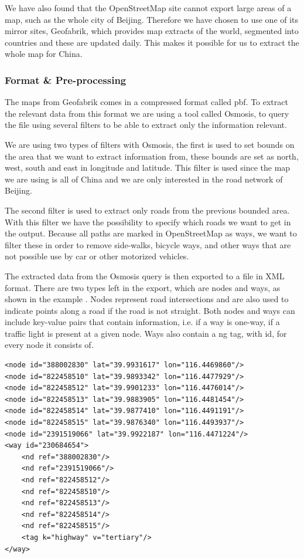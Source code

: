 We have also found that the OpenStreetMap site cannot export large areas of a map, such as the whole city of Beijing. Therefore we have chosen to use one of its mirror sites, Geofabrik\cite{geofabrik}, which provides map extracts of the world, segmented into countries and these are updated daily. This makes it possible for us to extract the whole map for China.

\subsubsection{Format \& Pre-processing}
\label{chap:FormatPre-processing}
The maps from Geofabrik comes in a compressed format called pbf. To extract the relevant data from this format we are using a tool called Osmosis, to query the file using several filters to be able to extract only the information relevant.

We are using two types of filters with Osmosis, the first is used to set bounds on the area that we want to extract information from, these bounds are set as north, west, south and east in longitude and latitude. This filter is used since the map we are using is all of China and we are only interested in the road network of Beijing. 

The second filter is used to extract only roads from the previous bounded area. With this filter we have the possibility to specify which roads we want to get in the output. Because all paths are marked in OpenStreetMap as ways, we want to filter these in order to remove side-walks, bicycle ways, and other ways that are not possible use by car or other motorized vehicles.

The extracted data from the Osmosis query is then exported to a file in XML format. There are two types left in the export, which are nodes and ways, as shown in the example . Nodes represent road intersections and are also used to indicate points along a road if the road is not straight. Both nodes and ways can include key-value pairs that contain information, i.e. if a way is one-way, if a traffic light is present at a given node. Ways also contain a ng tag, with id, for every node it consists of.

\begin{lstlisting}[style=Java, caption=An simplified example of a road and its related nodes in XML, label=wayexample]
<node id="388002830" lat="39.9931617" lon="116.4469860"/>
<node id="822458510" lat="39.9893342" lon="116.4477929"/>
<node id="822458512" lat="39.9901233" lon="116.4476014"/>
<node id="822458513" lat="39.9883905" lon="116.4481454"/>
<node id="822458514" lat="39.9877410" lon="116.4491191"/>
<node id="822458515" lat="39.9876340" lon="116.4493937"/>
<node id="2391519066" lat="39.9922187" lon="116.4471224"/>
<way id="230684654">
    <nd ref="388002830"/>
    <nd ref="2391519066"/>
    <nd ref="822458512"/>
    <nd ref="822458510"/>
    <nd ref="822458513"/>
    <nd ref="822458514"/>
    <nd ref="822458515"/>
    <tag k="highway" v="tertiary"/>
</way>
\end{lstlisting}

